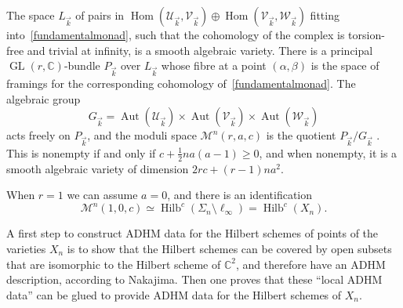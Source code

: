 \documentclass[pdftex]{sigma}
\numberwithin{equation}{section}
\begin{document}
The space $L_{\vec{k}}$ of pairs in $\operatorname{Hom}(\mathcal{U}_{\vec{k}},\mathcal{V}_{\vec{k}})\oplus\operatorname{Hom}(\mathcal{V}_{\vec{k}},\mathcal{W}_{\vec{k}})$ fitting into~\eqref{fundamentalmonad},
such that the cohomology of the complex is torsion-free and trivial at infinity, is a smooth algebraic variety.
There is a principal $\operatorname{GL}(r,\mathbb{C})$-bundle $P_{\vec{k}}$ over $L_{\vec{k}}$ whose fibre at a point $(\alpha,\beta)$ is the space of framings for the corresponding cohomology of~\eqref{fundamentalmonad}.
The algebraic group
\[
G_{\vec{k}}=\operatorname{Aut}(\mathcal{U}_{\vec{k}})\times\operatorname{Aut}(\mathcal{V}_{\vec{k}})\times\operatorname{Aut}(\mathcal{W}_{\vec{k}})
\]
acts freely on $P_{\vec{k}}$, and the moduli space $\mathcal{M}^{n}(r,a,c)$ is the quotient $P_{\vec{k}}/G_{\vec{k}}$ \cite[Theorem 3.4]{bbr}. This is nonempty if and only if $c + \frac{1}{2} na(a-1) \geq 0$, and when nonempty, it is a smooth algebraic variety of dimension $2rc + (r-1) na^2$.

When $r=1$ we can assume $a=0$, and there is an identification
\begin{equation*}
\mathcal{M}^{n}(1,0,c) \simeq \operatorname{Hilb}^c (\Sigma_n \setminus \ell_{\infty}) = \operatorname{Hilb}^c (X_{n}) .
\end{equation*}

A first step to construct ADHM data for the Hilbert schemes of points of the varieties $X_n$
is to show that the Hilbert schemes can be covered by open subsets that are isomorphic to the Hilbert scheme of $\mathbb C^2$,
and therefore have an ADHM description, according to Nakajima. Then one proves that these ``local ADHM data'' can be glued to provide ADHM data for the Hilbert schemes of $X_n$.
\end{document}
